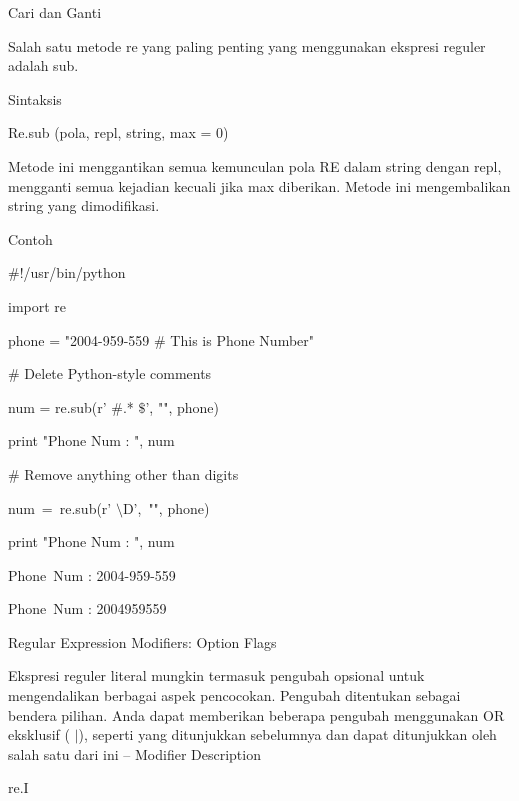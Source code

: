\noindent 
Cari dan Ganti \par
\vspace{12pt}
\noindent 
Salah satu metode re yang paling penting yang menggunakan ekspresi reguler adalah sub. \par
\noindent 
Sintaksis \par
\vspace{12pt}
Re.sub (pola, repl, string, max = 0) \par
\vspace{12pt}
\noindent 
Metode ini menggantikan semua kemunculan pola RE dalam string dengan repl, mengganti semua kejadian kecuali jika max diberikan. Metode ini mengembalikan string yang dimodifikasi. \par
Contoh \par
\noindent 
 $  \#  $!/usr/bin/python \par
\noindent 
import re \par
\vspace{12pt}
\noindent 
phone = "2004-959-559  $  \#  $ This is Phone Number" \par
\vspace{12pt}
\noindent 
 $  \#  $ Delete Python-style comments \par
\noindent 
num = re.sub(r' $  \#  $.* $  \$  $', "", phone) \par
\noindent 
print "Phone Num : ", num \par
\vspace{12pt}
\noindent 
 $  \#  $ Remove anything other than digits \par
\noindent 
num~=~re.sub(r' $  \setminus  $D',~"", phone)     \par
\noindent 
print "Phone Num : ", num \par
\vspace{12pt}
\noindent 
Phone~Num :  2004-959-559 \par
\noindent 
Phone~Num :  2004959559 \par
\vspace{12pt}
\noindent 
Regular Expression Modifiers: Option Flags \par
Ekspresi reguler literal mungkin termasuk pengubah opsional untuk mengendalikan berbagai aspek pencocokan. Pengubah ditentukan sebagai bendera pilihan. Anda dapat memberikan beberapa pengubah menggunakan OR eksklusif ( $  \vert  $), seperti yang ditunjukkan sebelumnya dan dapat ditunjukkan oleh salah satu dari ini – Modifier Description  \par
\noindent 
re.I \hspace*{0.5in}  \par
